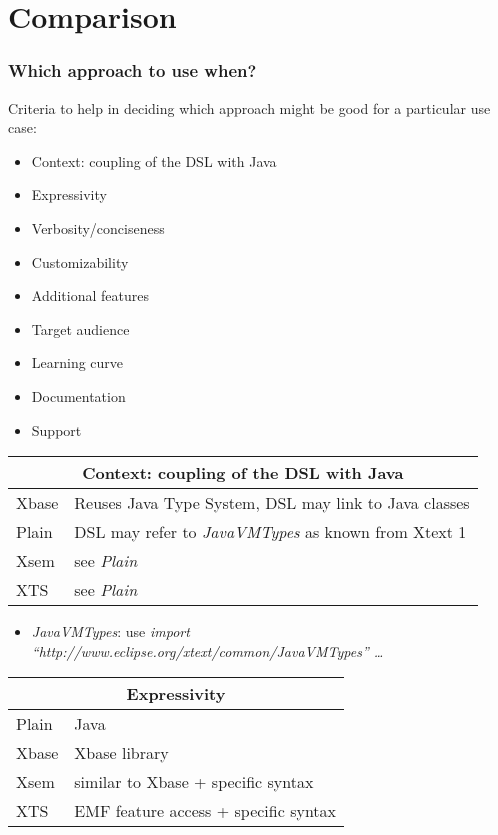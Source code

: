 \section{Comparison}

\begin{frame}
  \frametitle{Which approach to use when?}
  
  Criteria to help in deciding which approach might be good for a particular use
  case:
  \begin{itemize}
    \item Context: coupling of the DSL with Java
    \item Expressivity
    \item Verbosity/conciseness
    \item Customizability
    \item Additional features
    \item Target audience
    \item Learning curve
    \item Documentation
    \item Support
  \end{itemize}

\framebreak  
\begin{tabularx}{\linewidth}{ l   X }
\multicolumn{2}{c}{Context: coupling of the DSL with Java} \\ \hline
Xbase & Reuses Java Type System, DSL may link to Java classes \\
Plain & DSL may refer to \emph{JavaVMTypes} as known from Xtext 1\\
Xsem & see \emph{Plain} \\
XTS & see \emph{Plain} \\
\end{tabularx}
\begin{itemize}
  \item \emph{JavaVMTypes}: use \emph{import
  ``http://\-www.eclipse.org/\-xtext/\-common/\-JavaVMTypes'' \ldots}
\end{itemize}

\framebreak
\begin{tabularx}{\linewidth}{ l   X }
\multicolumn{2}{c}{Expressivity} \\ \hline
Plain & Java \\
Xbase & Xbase library \\
Xsem & similar to Xbase + specific syntax\\
XTS & EMF feature access + specific syntax\\
\end{tabularx}


\end{frame}
